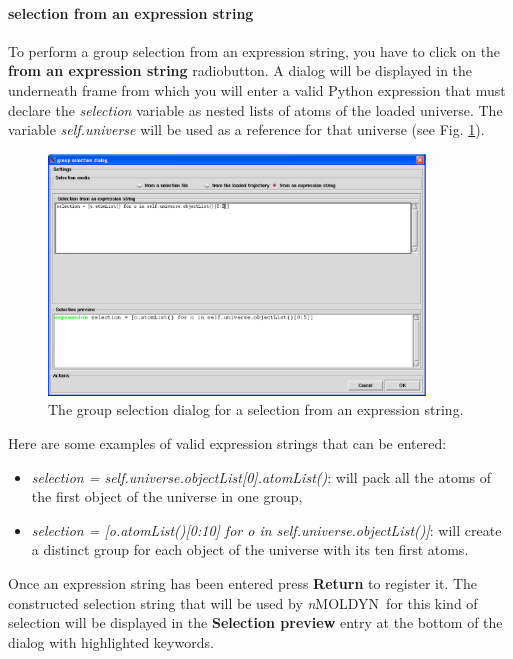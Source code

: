 \documentclass[a4paper,11pt]{report}
\newcommand{\NMOLDYN}{\textit{n}MOLDYN}
\begin{document}
\paragraph{selection from an expression string\\}
To perform a group selection from an expression string, you have to click on the \textbf{from an expression string} 
radiobutton. A dialog will be displayed in the underneath frame from which you will enter a valid Python expression 
that must declare the \textit{selection} variable as nested lists of atoms of the loaded universe. The variable 
\textit{self.universe} will be used as a reference for that universe (see Fig. \ref{fig:group_selection_from_an_expression_string}).
\newpage
\begin{figure}[h!]
\begin{center}
\includegraphics[width=10cm]{Figures/group_selection_from_an_expression_string.eps}
\end{center}
\caption[The group selection dialog for a selection from an expression string]{The group selection dialog for a selection from an expression string.}
\label{fig:group_selection_from_an_expression_string}
\end{figure}   

Here are some examples of valid expression strings that can be entered:
\begin{itemize}
\item \textit{selection = self.universe.objectList[0].atomList()}: will pack all the atoms of the first object of the universe in one group,
\item \textit{selection = [o.atomList()[0:10] for o in self.universe.objectList()]}: will create a distinct group for each 
object of the universe with its ten first atoms.
\end{itemize}

Once an expression string has been entered press \textbf{Return} to register it. The constructed selection string that will 
be used by \NMOLDYN\ for this kind of selection will be displayed in the \textbf{Selection preview} entry at the bottom of 
the dialog with highlighted keywords.
\end{document}

